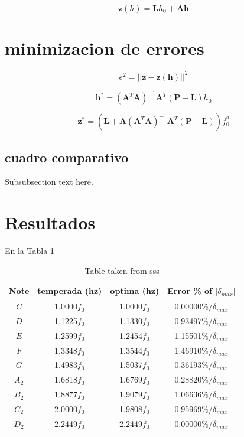 \documentclass[journal]{IEEEtran}
\begin{document}
\begin{equation}
\mathbf{z}(h) =  \mathbf{L}h_0 +  \mathbf{A} \mathbf{h}
\end{equation}


\section{minimizacion de errores}

\begin{equation}
e^2= || \mathbf{\hat{z}} - \mathbf{z}(\mathbf{h}) ||^2
\end{equation}

\begin{equation}
\mathbf{h}^{*}=
 \left(\mathbf{A}^T\mathbf{A}\right)^{-1}\mathbf{A}^T
 \left(\mathbf{P}-\mathbf{L}\right)
h_0
\end{equation}

\begin{equation}
\mathbf{z}^{*}=
\left(\mathbf{L}
+\mathbf{A}\left(\mathbf{A}^T\mathbf{A}\right)^{-1}\mathbf{A}^T
 \left(\mathbf{P}-\mathbf{L}\right) \right)
f_0^2
\end{equation}

\subsection{cuadro comparativo}
Subsubsection text here.





\section{Resultados}

En la Tabla \ref{table:res}

\begin{table}[h]
\center
\begin{tabular}{c|c|c|c}
Note & temperada (hz)& optima (hz) & Error \% of $|\delta_{max}| $ \\ \hline
\hline 
$C$  & 1.0000$f_0$ & 1.0000$f_0$ & 0.00000\%$/\delta_{max}$ \\
$D$  & 1.1225$f_0$ & 1.1330$f_0$ & 0.93497\%$/\delta_{max}$ \\
$E$  & 1.2599$f_0$ & 1.2454$f_0$ & 1.15501\%$/\delta_{max}$ \\
$F$  & 1.3348$f_0$ & 1.3544$f_0$ & 1.46910\%$/\delta_{max}$ \\
$G$  & 1.4983$f_0$ & 1.5037$f_0$ & 0.36193\%$/\delta_{max}$ \\
$A_2$& 1.6818$f_0$ & 1.6769$f_0$ & 0.28820\%$/\delta_{max}$ \\
$B_2$& 1.8877$f_0$ & 1.9079$f_0$ & 1.06636\%$/\delta_{max}$ \\
$C_2$& 2.0000$f_0$ & 1.9808$f_0$ & 0.95969\%$/\delta_{max}$ \\
$D_2$& 2.2449$f_0$ & 2.2449$f_0$ & 0.00000\%$/\delta_{max}$ \\ \hline
\end{tabular}
\caption{Table taken from sss}
\label{table:res}
\end{table}
\end{document}
